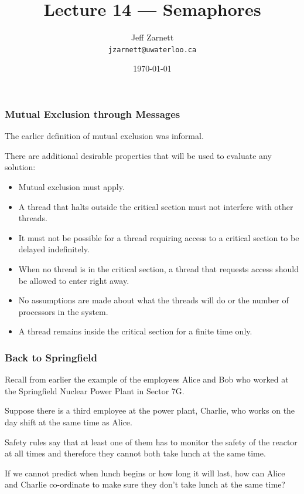 

\title{Lecture 14 --- Semaphores }

\author{Jeff Zarnett \\ \small \texttt{jzarnett@uwaterloo.ca}}
\date{\today}




\begin{frame}
  \titlepage

 \end{frame}

\begin{frame}
\frametitle{Mutual Exclusion through Messages}

The earlier definition of mutual exclusion was informal.

There are additional desirable properties that will be used to evaluate any solution:
\begin{itemize}
	\item Mutual exclusion must apply.
	\item A thread that halts outside the critical section must not interfere with other threads.
	\item It must not be possible for a thread requiring access to a critical section to be delayed indefinitely.
	\item When no thread is in the critical section, a thread that requests access should be allowed to enter right away.
	\item No assumptions are made about what the threads will do or the number of processors in the system.
	\item A thread remains inside the critical section for a finite time only.
\end{itemize}


\end{frame}

\begin{frame}
\frametitle{Back to Springfield}
Recall from earlier the example of the employees Alice and Bob who worked at the Springfield Nuclear Power Plant in Sector 7G.  

Suppose there is a third employee at the power plant, Charlie, who works on the day shift at the same time as Alice. 

Safety rules say that at least one of them has to monitor the safety of the reactor at all times and therefore they cannot both take lunch at the same time. 

If we cannot predict when lunch begins or how long it will last, how can Alice and Charlie co-ordinate to make sure they don't take lunch at the same time?

\end{frame}

